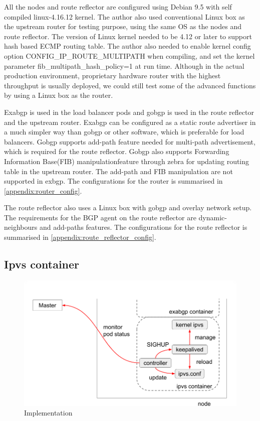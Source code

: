 All the nodes and route reflector are configured using Debian 9.5 with self compiled linux-4.16.12 kernel.  
The author also used conventional Linux box as the upstream router for testing purpose, using the same OS as the nodes and route reflector.
The version of Linux kernel needed to be 4.12 or later to support hash based ECMP routing table.
The author also needed to enable kernel config option CONFIG\_IP\_ROUTE\_MULTIPATH\cite{ipsysctl} when compiling, and set the kernel parameter fib\_multipath\_hash\_policy=1 at run time.
Although in the actual production environment, proprietary hardware router with the highest throughput is usually deployed,
we could still test some of the advanced functions by using a Linux box as the router.

Exabgp is used in the load balancer pods and gobgp is used in the route reflector and the upstream router.
Exabgp can be configured as a static route advertiser in a much simpler way than gobgp or other software, which is preferable for load balancers.
Gobgp supports add-path\cite{rfc7911} feature needed for multi-path advertisement, which is required for the route reflector.
Gobgp also supports Forwarding Information Base(FIB) manipulation\cite{exa-networks_2018}feature through zebra\cite{osrg_gobgp_zebra} for updating routing table in the upstream router.
The add-path and FIB manipulation are not supported in exbgp.
The configurations for the router is summarised in \ref{appendix:router_config}.

The route reflector also uses a Linux box with gobgp and overlay network setup.
The requirements for the BGP agent on the route reflector are dynamic-neighbours and add-paths features.
The configurations for the route reflector is summarised in \ref{appendix:route_reflector_config}.

\subsection{Ipvs container}\label{sec:ipvs}

\begin{figure}
\includegraphics[width=0.8\columnwidth]{Figs/ipvs-ingress-schem}
\caption{Implementation}
\label{fig:IPVS-ingress-schem}
\end{figure}

